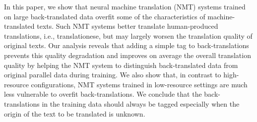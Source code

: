 In this paper, we show that neural machine translation (NMT) systems trained on large back-translated data overfit some of the characteristics of machine-translated texts. Such NMT systems better translate human-produced translations, i.e., translationese, but may largely worsen the translation quality of original texts. Our analysis reveals that adding a simple tag to back-translations prevents this quality degradation and improves on average the overall translation quality by helping the NMT system to distinguish back-translated data from original parallel data during training. We also show that, in contrast to high-resource configurations, NMT systems trained in low-resource settings are much less vulnerable to overfit back-translations. We conclude that the back-translations in the training data should always be tagged especially when the origin of the text to be translated is unknown.
